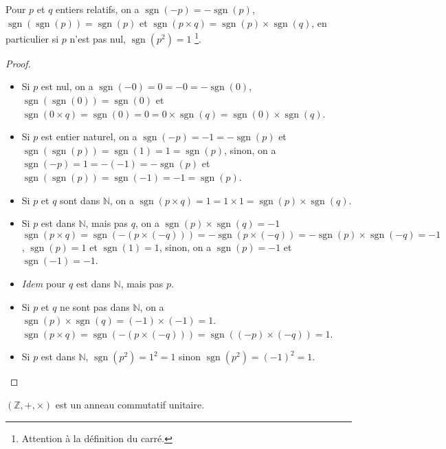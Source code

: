 \begin{theorem}
Pour \(𝑝\) et \(𝑞\) entiers relatifs, on a \(\operatorname{sgn}(-𝑝)=-\operatorname{sgn}(𝑝)\),
\(\operatorname{sgn}(\operatorname{sgn}(𝑝))=\operatorname{sgn}(𝑝)\) et
\(\operatorname{sgn}(𝑝×𝑞)=\operatorname{sgn}(𝑝)×\operatorname{sgn}(𝑞)\), en particulier si \(𝑝\) n'est pas nul,
\(\operatorname{sgn}(𝑝^2)=1\) \footnote{Attention à la définition du carré.}.
\end{theorem}
\begin{proof}
\par\noindent
\begin{itemize}
\item
Si \(𝑝\) est nul, on a
\(\operatorname{sgn}(-0)=0=-0=-\operatorname{sgn}(0)\),
\(\operatorname{sgn}(\operatorname{sgn}(0))=\operatorname{sgn}(0)\) et
\(\operatorname{sgn}(0×𝑞)=\operatorname{sgn}(0)=0=0×\operatorname{sgn}(𝑞)=\operatorname{sgn}(0)×\operatorname{sgn}(𝑞)\).
\item
Si \(𝑝\) est entier naturel, on a
\(\operatorname{sgn}(-𝑝)=-1=-\operatorname{sgn}(𝑝)\) et
\(\operatorname{sgn}(\operatorname{sgn}(𝑝))=\operatorname{sgn}(1)=1=\operatorname{sgn}(𝑝)\),
sinon, on a
\(\operatorname{sgn}(-𝑝)=1=-(-1)=-\operatorname{sgn}(𝑝)\) et
\(\operatorname{sgn}(\operatorname{sgn}(𝑝))=\operatorname{sgn}(-1)=-1=\operatorname{sgn}(𝑝)\).
\item

Si \(𝑝\) et \(𝑞\) sont dans \(ℕ\), on a
\(\operatorname{sgn}(𝑝×𝑞)=1=1×1=\operatorname{sgn}(𝑝)×\operatorname{sgn}(𝑞)\).
\item
Si \(𝑝\) est dans \(ℕ\), mais pas \(𝑞\), on a \(\operatorname{sgn}(𝑝)×\operatorname{sgn}(𝑞)=-1\)
\(
\operatorname{sgn}(𝑝×𝑞)=\operatorname{sgn}(-(𝑝×(-𝑞)))=-\operatorname{sgn}(𝑝×(-𝑞))=-\operatorname{sgn}(𝑝)×\operatorname{sgn}(-𝑞)=-1
\),
\(\operatorname{sgn}(𝑝)=1\) et \(\operatorname{sgn}(1)=1\), sinon, on a \(\operatorname{sgn}(𝑝)=-1\) et
\(\operatorname{sgn}(-1)=-1\).
\item
\emph{Idem} pour \(𝑞\) est dans \(ℕ\), mais pas \(𝑝\).
\item
Si \(𝑝\) et \(𝑞\) ne sont pas dans \(ℕ\), on a \(\operatorname{sgn}(𝑝)×\operatorname{sgn}(𝑞)=(-1)×(-1)=1\).
\(\operatorname{sgn}(𝑝×𝑞)=\operatorname{sgn}(-(𝑝×(-𝑞)))=\operatorname{sgn}((-𝑝)×(-𝑞))=1\).
\item
Si \(𝑝\) est dans \(ℕ\), \(\operatorname{sgn}(𝑝^2)=1^2=1\) sinon \(\operatorname{sgn}(𝑝^2)=(-1)^2=1\).
\qedhere
\end{itemize}
\end{proof}
%
\begin{theorem}
\((ℤ,+,×)\) est un anneau commutatif unitaire.
\end{theorem}
